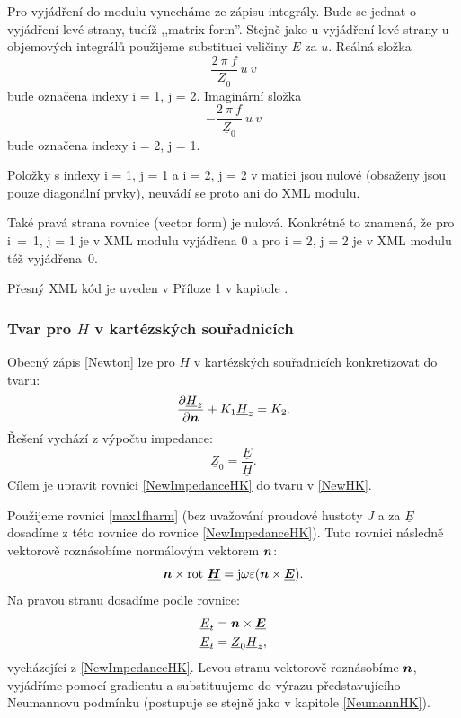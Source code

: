 \documentclass[12pt,a4paper,oneside]{article}
\numberwithin{equation}{section} %
\numberwithin{figure}{section} %
\numberwithin{table}{section} %
\newcommand{\mj}{\mathrm{j}} %
\renewcommand{\vec}[1]{\mbox{\boldmath$#1$}} %
\newcommand{\faz}[1]{{\underline{#1}}} %
\newcommand{\rot}{\mathrm{rot}\ }
\begin{document}
Pro vyjádření do modulu vynecháme ze zápisu integrály. Bude se jednat o vyjádření levé strany, tudíž ,,matrix form''. Stejně jako u vyjádření levé strany u objemových integrálů použijeme substituci veličiny $E$ za $u$. Reálná složka 
\begin{equation}
\frac{2 ~ \pi ~ f}{\faz{Z} _0} ~ u ~ v
\end{equation} 
bude označena indexy i = 1, j = 2. Imaginární složka 
\begin{equation}
- \frac{2 ~ \pi ~ f}{\faz{Z} _0} ~ u ~ v
\end{equation}
bude označena indexy i = 2, j = 1.

Položky s indexy i = 1, j = 1 a i = 2, j = 2 v matici jsou nulové (obsaženy jsou pouze diagonální prvky), neuvádí se proto ani do XML modulu.

Také pravá strana rovnice (vector form) je nulová. Konkrétně to znamená, že pro i~=~1, j = 1 je v XML modulu vyjádřena $0$ a pro i = 2, j = 2 je v XML modulu též vyjádřena~$0$.

Přesný XML kód je uveden v Příloze 1 v kapitole .


\subsubsection*{Tvar pro \faz{\vec{H}} v kartézských souřadnicích}
Obecný zápis \ref{Newton} lze pro \faz{\vec{H}} v kartézských souřadnicích konkretizovat do tvaru:
\begin{equation}
\label{NewHK}
\frac{\partial \faz{H} _z}{\partial \vec{n}} + K_1 \faz{H} _z = K_2 .
\end{equation}
Řešení vychází z výpočtu impedance: 
\begin{equation}
\label{NewImpedanceHK}
\faz{Z} _0 = \frac{\faz{E}}{\faz{H}} .
\end{equation}
Cílem je upravit rovnici \ref{NewImpedanceHK} do tvaru v \ref{NewHK}.

Použijeme rovnici \ref{max1fharm} (bez uvažování proudové hustoty $J$ a za $\faz{E}$ dosadíme z této rovnice do rovnice \ref{NewImpedanceHK}). Tuto rovnici následně vektorově roznásobíme normálovým vektorem $\vec{n}$:
\begin{equation}
\vec{n} \times \rot \faz{\vec{H}} = \mj \omega \varepsilon (\vec{n} \times \faz{\vec{E}}) .
\end{equation}
Na pravou stranu dosadíme podle rovnice:
\begin{subequations}
\begin{align}
\faz{E} _t &= \vec{n} \times \faz{\vec{E}}
\\
\faz{E} _t &= \faz{Z} _0 \faz{H} _z ,
\end{align}
\end{subequations}
vycházející z \ref{NewImpedanceHK}. Levou stranu vektorově roznásobíme $\vec{n}$, vyjádříme pomocí gradientu a substituujeme do výrazu představujícího Neumannovu podmínku (postupuje se stejně jako v kapitole \ref{NeumannHK}).
\end{document}
